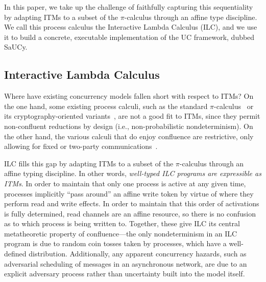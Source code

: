 In this paper, we take up the challenge of faithfully capturing this
sequentiality by adapting ITMs to a subset of the $\pi$-calculus through an affine
type discipline. We call this process calculus the Interactive Lambda Calculus
(ILC), and we use it to build a concrete, executable implementation of the UC
framework, dubbed SaUCy.


\subsection{Interactive Lambda Calculus}
Where have existing concurrency models fallen short with respect to ITMs? On the
one hand, some existing process calculi, such as the standard
$\pi$-calculus~\cite{milner1999communicating} or its cryptography-oriented
variants~\cite{abadi1999calculus, abadi2001mobile, lincoln1998probabilistic},
are not a good fit to ITMs, since they permit non-confluent reductions by design
(i.e., non-probabilistic nondeterminism).
On the other hand, the various calculi that do enjoy confluence are
restrictive, only allowing for fixed or two-party
communications~\cite{kobayashi1999linearity,bohl2016symbolic,fowler2018session}.

ILC fills this gap by adapting ITMs to a subset of the $\pi$-calculus through an
affine typing discipline. In other words, \emph{well-typed ILC programs are
  expressible as ITMs}. In order to maintain that only one process is active at
any given time, processes implicitly ``pass around'' an affine write token by
virtue of where they perform read and write effects. In order to maintain that
this order of activations is fully determined, read channels are an affine
resource, so there is no confusion as to which process is being written
to. Together, these give ILC its central metatheoretic property of
confluence---the only nondeterminism in an ILC program is due to random coin
tosses taken by processes, which have a well-defined distribution. Additionally,
any apparent concurrency hazards, such as adversarial scheduling of messages in
an asynchronous network, are due to an explicit adversary process rather than
uncertainty built into the model itself.

